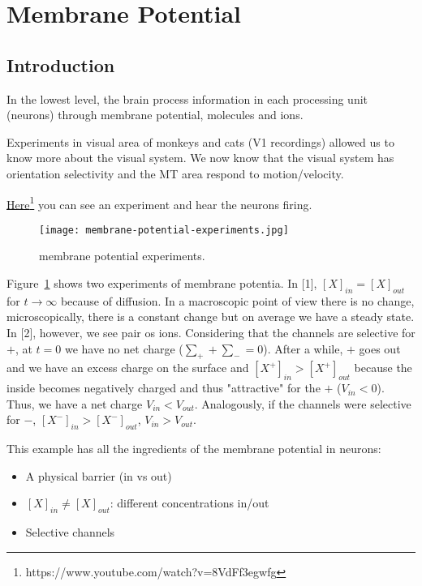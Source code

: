 \documentclass[main]{subfiles}
\begin{document}

\section{Membrane Potential}

\subsection{Introduction}
In the lowest level, the brain process information in each processing unit (neurons) through membrane potential, molecules and ions.

Experiments in visual area of monkeys and cats (V1 recordings) allowed us to know more about the visual system. We now know that the visual system has orientation selectivity and the MT area respond to motion/velocity.

\href{https://www.youtube.com/watch?v=8VdFf3egwfg}{Here\footnote{https://www.youtube.com/watch?v=8VdFf3egwfg}} you can see an experiment and hear the neurons firing.

\begin{figure}[H]
	\centering
	\texttt{[image: membrane-potential-experiments.jpg]}
	\caption{membrane potential experiments.}
	\label{fig:membrane-potential-experiments}
\end{figure}

Figure~\ref{fig:membrane-potential-experiments} shows two experiments of membrane potentia. In [1], $[X]_{in} = [X]_{out}$ for $t \to \infty$ because of diffusion. In a macroscopic point of view there is no change, microscopically, there is a constant change but on average we have a steady state.
In [2], however, we see pair os ions. Considering that the channels are selective for $+$, at $t=0$ we have no net charge ($\sum_+ + \sum_- = 0$). After a while, $+$ goes out and we have an excess charge on the surface and $[X^+]_{in} > [X^+]_{out}$ because the inside becomes negatively charged and thus "attractive" for the $+$ ($V_{in} < 0$). Thus, we have a net charge $V_{in} < V_{out}$.
Analogously, if the channels were selective for $-$, $[X^-]_{in} > [X^-]_{out}$, $V_{in} > V_{out}$.

This example has all the ingredients of the membrane potential in neurons:
\begin{itemize}
\item A physical barrier (in vs out)
\item $[X]_{in} \neq [X]_{out}$: different concentrations in/out
\item Selective channels
\end{itemize}
\end{document}

